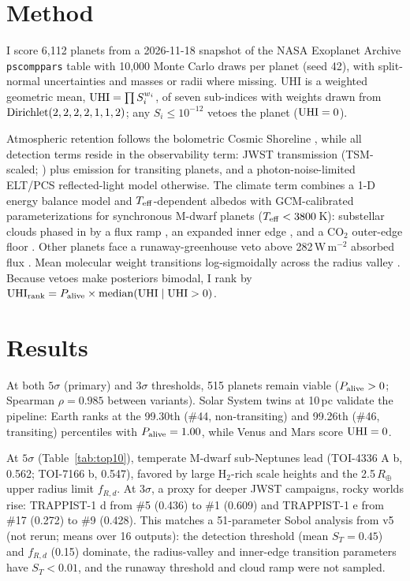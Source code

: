 \documentclass{aastex702}
\begin{document}
\section{Method}

I score 6,112 planets from a 2026-11-18 snapshot of the NASA Exoplanet Archive \texttt{pscomppars} table \citep{Christiansen2025} with 10,000 Monte Carlo draws per planet (seed 42), with split-normal uncertainties and \citet{Chen2017} masses or radii where missing. UHI is a weighted geometric mean, ${\rm UHI} = \prod S_i^{w_i}$, of seven sub-indices with weights drawn from ${\rm Dirichlet}(2,2,2,2,1,1,2)$; any $S_i \leq 10^{-12}$ vetoes the planet (${\rm UHI} = 0$).

Atmospheric retention follows the bolometric Cosmic Shoreline \citep{Zahnle2017}, while all detection terms reside in the observability term: JWST transmission (TSM-scaled; \citealt{Kempton2018}) plus emission for transiting planets, and a photon-noise-limited ELT/PCS reflected-light model \citep{Kasper2021} otherwise. The climate term combines a 1-D energy balance model \citep{North1981} and $T_{\rm eff}$-dependent albedos \citep{Shields2013} with GCM-calibrated parameterizations for synchronous M-dwarf planets ($T_{\rm eff} < 3800$\,K): substellar clouds phased in by a flux ramp \citep{Yang2013}, an expanded inner edge \citep{Kopparapu2016}, and a CO$_2$ outer-edge floor \citep{Turbet2018}. Other planets face a runaway-greenhouse veto above 282\,W\,m$^{-2}$ absorbed flux \citep{Goldblatt2013,Goldblatt2014}. Mean molecular weight transitions log-sigmoidally across the radius valley \citep{Fulton2017}. Because vetoes make posteriors bimodal, I rank by ${\rm UHI}_{\rm rank} = P_{\rm alive} \times {\rm median}({\rm UHI} \mid {\rm UHI} > 0)$.

\section{Results}

At both $5\sigma$ (primary) and $3\sigma$ thresholds, 515 planets remain viable ($P_{\rm alive} > 0$; Spearman $\rho = 0.985$ between variants). Solar System twins at 10\,pc validate the pipeline: Earth ranks at the 99.30th (\#44, non-transiting) and 99.26th (\#46, transiting) percentiles with $P_{\rm alive} = 1.00$, while Venus and Mars score ${\rm UHI} = 0$.

At $5\sigma$ (Table~\ref{tab:top10}), temperate M-dwarf sub-Neptunes lead (TOI-4336 A b, 0.562; TOI-7166 b, 0.547), favored by large H$_2$-rich scale heights and the 2.5\,$R_\oplus$ upper radius limit $f_{R,d}$. At $3\sigma$, a proxy for deeper JWST campaigns, rocky worlds rise: TRAPPIST-1 d from \#5 (0.436) to \#1 (0.609) and TRAPPIST-1 e from \#17 (0.272) to \#9 (0.428). This matches a 51-parameter Sobol analysis \citep[SALib;][]{Herman2017} from v5 (not rerun; means over 16 outputs): the detection threshold (mean $S_T = 0.45$) and $f_{R,d}$ (0.15) dominate, the radius-valley and inner-edge transition parameters have $S_T < 0.01$, and the runaway threshold and cloud ramp were not sampled.
\end{document}
